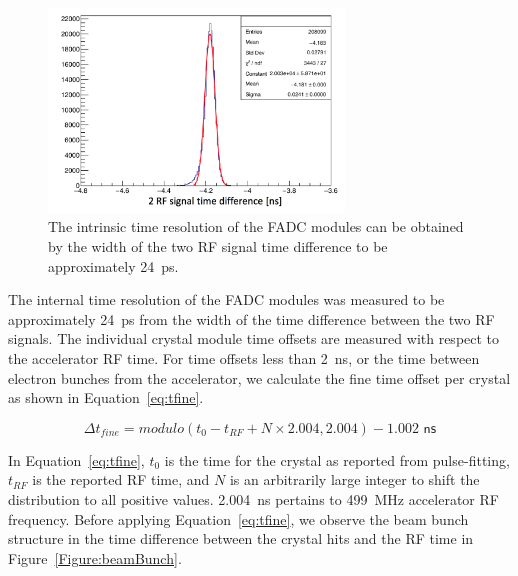 \begin{figure}[H]
  \centering
      \includegraphics[width=0.7\textwidth]{pics/performance/rfRes.png}
  \caption[FADC intrinsic time resolution]{The intrinsic time resolution of the FADC modules can be obtained by the width of the two RF signal time difference to be approximately 24~ps.}
  \label{Figure:intrTres}
\end{figure}

The internal time resolution of the FADC modules was measured to be approximately 24~ps from the width of the time difference between the two RF signals. The individual crystal module time offsets are measured with respect to the accelerator RF time. For time offsets less than 2~ns, or the time between electron bunches from the accelerator, we calculate the fine time offset per crystal as shown in Equation~\eqref{eq:tfine}.

\begin{equation}
	\label{eq:tfine}
	\Delta t_{fine} = modulo(t_0 - t_{RF} + N\times 2.004, 2.004) - 1.002 \textsf{ ns}
\end{equation}

In Equation~\eqref{eq:tfine}, $t_0$ is the time for the crystal as reported from pulse-fitting, $t_{RF}$ is the reported RF time, and $N$ is an arbitrarily large integer to shift the distribution to all positive values. 2.004~ns pertains to 499~MHz accelerator RF frequency. Before applying Equation~\eqref{eq:tfine}, we observe the beam bunch structure in the time difference between the crystal hits and the RF time in Figure~\ref{Figure:beamBunch}. 

